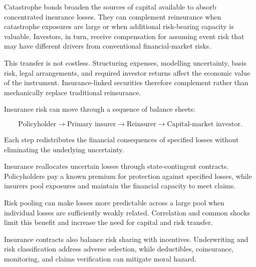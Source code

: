 Catastrophe bonds broaden the sources of capital available to absorb concentrated insurance losses. They can complement reinsurance when catastrophe exposures are large or when additional risk-bearing capacity is valuable. Investors, in turn, receive compensation for assuming event risk that may have different drivers from conventional financial-market risks.

This transfer is not costless. Structuring expenses, modelling uncertainty, basis risk, legal arrangements, and required investor returns affect the economic value of the instrument. Insurance-linked securities therefore complement rather than mechanically replace traditional reinsurance.

\begin{tcolorbox}[
enhanced,
breakable,
colback=white,
colframe=FinanceBlue,
boxrule=0.7pt,
sharp corners,
borderline west={2.2pt}{0pt}{FinanceBlue},
title=\textbf{Financial Perspective: Extending Risk Transfer Beyond Insurance Balance Sheets},
coltitle=white,
colbacktitle=FinanceBlue,
fonttitle=\bfseries,
before skip=1.2em,
after skip=1.2em
]

Insurance risk can move through a sequence of balance sheets:

$$
\text{Policyholder}
\rightarrow
\text{Primary insurer}
\rightarrow
\text{Reinsurer}
\rightarrow
\text{Capital-market investor}.
$$

Each step redistributes the financial consequences of specified losses without eliminating the underlying uncertainty.

\end{tcolorbox}




Insurance reallocates uncertain losses through state-contingent contracts. Policyholders pay a known premium for protection against specified losses, while insurers pool exposures and maintain the financial capacity to meet claims.

Risk pooling can make losses more predictable across a large pool when individual losses are sufficiently weakly related. Correlation and common shocks limit this benefit and increase the need for capital and risk transfer.

Insurance contracts also balance risk sharing with incentives. Underwriting and risk classification address adverse selection, while deductibles, coinsurance, monitoring, and claims verification can mitigate moral hazard.

